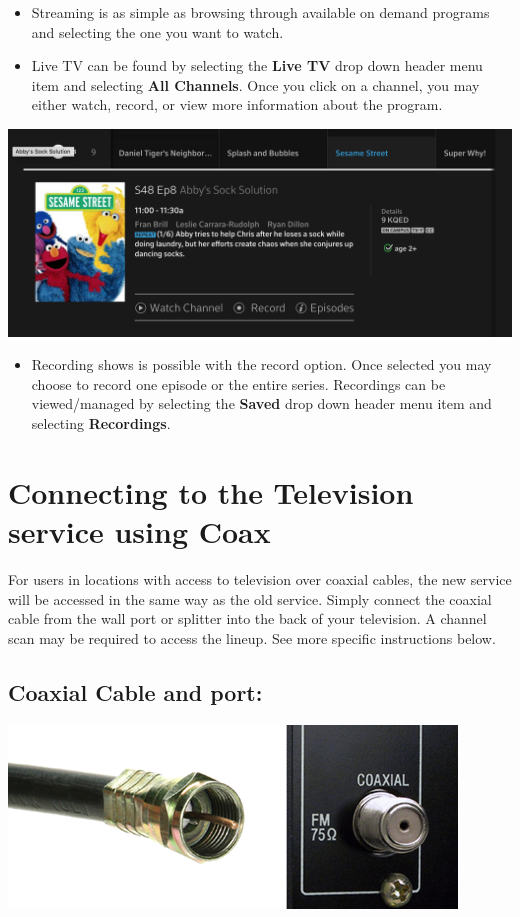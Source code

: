 \documentclass[a4paper, 11pt]{article}
\begin{document}
\begin{itemize}
  \item Streaming is as simple as browsing through available on demand 
  programs and selecting the one you want to watch.
  \item Live TV can be found by selecting the \textbf{Live TV} drop down 
  header menu item and selecting \textbf{All Channels}.  Once you click
  on a channel, you may either watch, record, or view more information
  about the program.
\end{itemize}
\includegraphics[width=\linewidth, keepaspectratio]{seas.png}
\begin{itemize}
  \item Recording shows is possible with the record option.  Once selected
  you may choose to record one episode or the entire series.  Recordings 
  can be viewed/managed by selecting the \textbf{Saved} drop down header
  menu item and selecting \textbf{Recordings}.
\end{itemize}
\newpage
\section*{
  Connecting to the Television service using Coax
}
For users in locations with access to television over coaxial cables, the new service will be accessed in the same way as the old service. Simply connect the coaxial cable from the wall port or splitter into the back of your television. A channel scan may be required to access the lineup. See more specific instructions below.

\subsection*{Coaxial Cable and port:}
\includegraphics[width=\linewidth, keepaspectratio]{coax.png}
\end{document}
